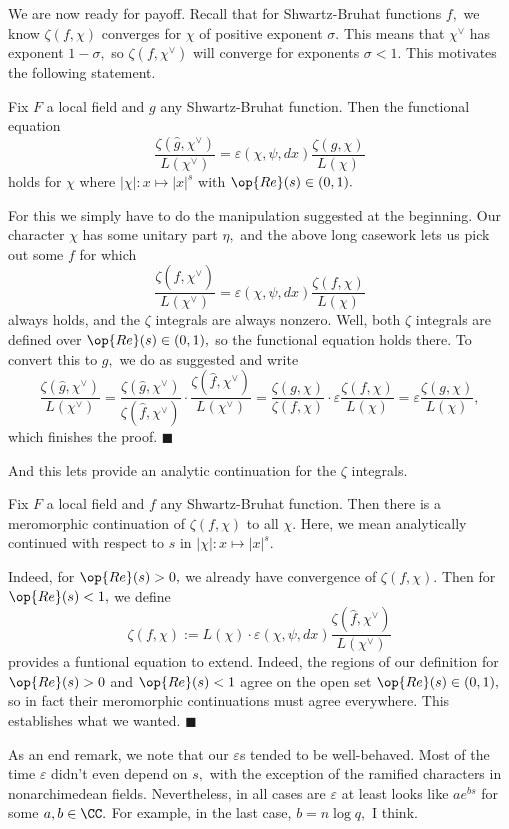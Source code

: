 We are now ready for payoff. Recall that for Shwartz-Bruhat functions $f,$ we know $\zeta(f,\chi)$ converges for $\chi$ of positive exponent $\sigma.$ This means that $\chi^\vee$ has exponent $1-\sigma,$ so $\zeta(f,\chi^\vee)$ will converge for exponents $\sigma<1.$ This motivates the following statement.
\begin{theorem}
    Fix $F$ a local field and $g$ any Shwartz-Bruhat function. Then the functional equation
    \[\frac{\zeta(\hat g,\chi^\vee)}{L(\chi^\vee)}=\varepsilon(\chi,\psi,dx)\frac{\zeta(g,\chi)}{L(\chi)}\]
    holds for $\chi$ where $|\chi|:x\mapsto|x|^s$ with $\op{Re}(s)\in(0,1).$
\end{theorem}
For this we simply have to do the manipulation suggested at the beginning. Our character $\chi$ has some unitary part $\eta,$ and the above long casework lets us pick out some $f$ for which
\[\frac{\zeta(\hat f,\chi^\vee)}{L(\chi^\vee)}=\varepsilon(\chi,\psi,dx)\frac{\zeta(f,\chi)}{L(\chi)}\]
always holds, and the $\zeta$ integrals are always nonzero. Well, both $\zeta$ integrals are defined over $\op{Re}(s)\in(0,1),$ so the functional equation holds there. To convert this to $g,$ we do as suggested and write
\[\frac{\zeta(\hat g,\chi^\vee)}{L(\chi^\vee)}=\frac{\zeta(\hat g,\chi^\vee)}{\zeta(\hat f,\chi^\vee)}\cdot\frac{\zeta(\hat f,\chi^\vee)}{L(\chi^\vee)}=\frac{\zeta(g,\chi)}{\zeta(f,\chi)}\cdot\varepsilon\frac{\zeta(f,\chi)}{L(\chi)}=\varepsilon\frac{\zeta(g,\chi)}{L(\chi)},\]
which finishes the proof. $\blacksquare$

And this lets provide an analytic continuation for the $\zeta$ integrals.
\begin{theorem}
    Fix $F$ a local field and $f$ any Shwartz-Bruhat function. Then there is a meromorphic continuation of $\zeta(f,\chi)$ to all $\chi.$ Here, we mean analytically continued with respect to $s$ in $|\chi|:x\mapsto|x|^s.$
\end{theorem}
Indeed, for $\op{Re}(s)>0,$ we already have convergence of $\zeta(f,\chi).$ Then for $\op{Re}(s)<1,$ we define
\[\zeta(f,\chi):=L(\chi)\cdot\varepsilon(\chi,\psi,dx)\frac{\zeta(\hat f,\chi^\vee)}{L(\chi^\vee)}\]
provides a funtional equation to extend. Indeed, the regions of our definition for $\op{Re}(s)>0$ and $\op{Re}(s)<1$ agree on the open set $\op{Re}(s)\in(0,1),$ so in fact their meromorphic continuations must agree everywhere. This establishes what we wanted. $\blacksquare$

As an end remark, we note that our $\varepsilon$s tended to be well-behaved. Most of the time $\varepsilon$ didn't even depend on $s,$ with the exception of the ramified characters in nonarchimedean fields. Nevertheless, in all cases are $\varepsilon$ at least looks like $ae^{bs}$ for some $a,b\in\CC.$ For example, in the last case, $b=n\log q,$ I think.


